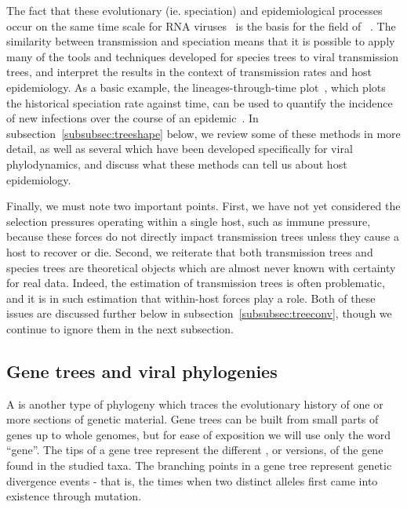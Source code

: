 The fact that these evolutionary (ie. speciation) and epidemiological processes
occur on the same time scale for RNA viruses~\autocite{drummond2003measurably}
is the basis for the field of
~\autocite{grenfell2004unifying}. The similarity between
transmission and speciation means that it is possible to apply many of the
tools and techniques developed for species trees to viral transmission trees,
and interpret the results in the context of transmission rates and host
epidemiology. As a basic example, the lineages-through-time
plot~\autocite{nee1992tempo}, which plots the historical speciation rate
against time, can be used to quantify the incidence of new infections over the
course of an epidemic~\autocite{holmes1995revealing}. In
subsection~\ref{subsubsec:treeshape} below, we review some of these methods in
more detail, as well as several which have been developed specifically for
viral phylodynamics, and discuss what these methods can tell us about host
epidemiology.

Finally, we must note two important points. First, we have not yet considered
the selection pressures operating within a single host, such as immune
pressure, because these forces do not directly impact transmission trees unless
they cause a host to recover or die. Second, we reiterate that both
transmission trees and species trees are theoretical objects which are almost
never known with certainty for real data. Indeed, the estimation of
transmission trees is often problematic, and it is in such estimation that
within-host forces play a role. Both of these issues are discussed further
below in subsection~\ref{subsubsec:treeconv}, though we continue to ignore them
in the next subsection.

\subsection{Gene trees and viral phylogenies}
\label{subsubsec:genetree}

A  is another type of phylogeny which traces the evolutionary
history of one or more sections of genetic material. Gene trees can be built
from small parts of genes up to whole genomes, but for ease of exposition we
will use only the word ``gene''. The tips of a gene tree represent the
different , or versions, of the gene found in the studied taxa.
The branching points in a gene tree represent genetic divergence events - that
is, the times when two distinct alleles first came into existence through
mutation.

